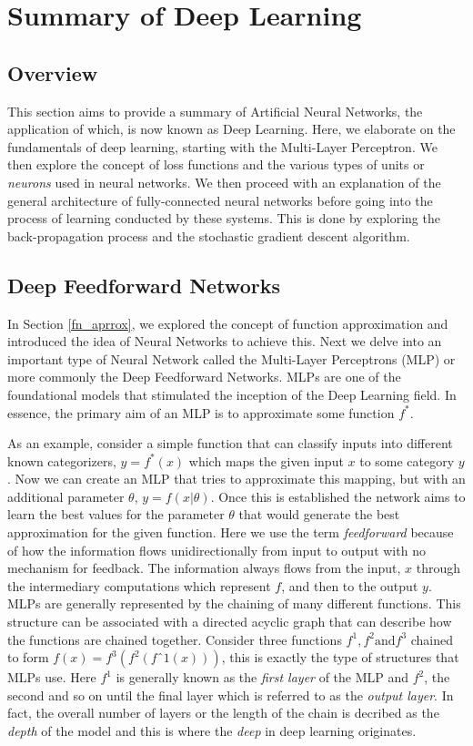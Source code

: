 \documentclass[12pt]{extarticle}
\numberwithin{equation}{section}
\begin{document}
	\section[Deep Learning]{Summary of Deep Learning}
	\subsection{Overview}
	This section aims to provide a summary of Artificial Neural Networks, the application of which, is now known as Deep Learning. Here, we elaborate on the fundamentals of deep learning, starting with the Multi-Layer Perceptron. We then explore the concept of loss functions and the various types of units or \textit{neurons} used in neural networks. We then proceed with an explanation of the general architecture of fully-connected neural networks before going into the process of learning conducted by these systems. This is done by exploring the back-propagation process and the stochastic gradient descent algorithm.
	\subsection{Deep Feedforward Networks}
	In Section \ref{fn_aprrox}, we explored the concept of function approximation and introduced the idea of Neural Networks to achieve this. Next we delve into an important type of Neural Network called the Multi-Layer Perceptrons (MLP) or more commonly the Deep Feedforward Networks. MLPs are one of the foundational models that stimulated the inception of the Deep Learning field. In essence, the primary aim of an MLP is to approximate some function $f^*$\cite{Goodfellow-et-al-2016}. 
	
	As an example, consider a simple function that can classify inputs into different known categorizers, $y = f^*(x)$ which maps the given input $x$ to some category $y$. Now we can create an MLP that tries to approximate this mapping, but with an additional parameter $\theta$, $y = f(x|\theta)$. Once this is established the network aims to learn the best values for the parameter $\theta$ that would generate the best approximation for the given function.
	Here we use the term \textit{feedforward}  because of how the information flows unidirectionally from input to output with no mechanism for feedback. The information always flows from the input, $x$ through the intermediary computations which represent $f$, and then to the output $y$. 
	MLPs are generally represented by the chaining of many different functions. This structure can be associated with a directed acyclic graph that can describe how the functions are chained together. Consider three functions $f^1, f^2 \text{and} f^3$ chained to form $f(x) = f^3(f^2(fˆ1(x) ))$, this is exactly the type of structures that MLPs use. Here $f^1$ is generally known as the \textit{first layer} of the MLP and $f^2$, the second and so on until the final layer which is referred to as the \textit{output layer}. In fact, the overall number of layers or the length of the chain is decribed as the \textit{depth} of the model and this is where the \textit{deep} in deep learning originates.
	
\end{document}
